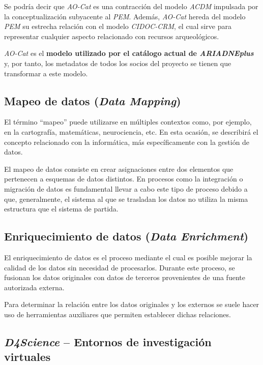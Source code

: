 Se podría decir que \emph{AO-Cat} es una
contracción del modelo \emph{ACDM} impulsada por la conceptualización
subyacente al \emph{PEM}. Además, \emph{AO-Cat} hereda del modelo \emph{PEM} su estrecha
relación con el modelo \emph{CIDOC-CRM}, el cual sirve para representar
cualquier aspecto relacionado con recursos arqueológicos.

\emph{AO-Cat} es el \textbf{modelo utilizado por el catálogo actual de \emph{ARIADNEplus}} y,
por tanto, los metadatos de todos los socios del proyecto se tienen que transformar a este
modelo.

\subsection{Mapeo de datos (\emph{Data Mapping})}

El término ``mapeo'' puede utilizarse en múltiples contextos como, por
ejemplo, en la cartografía, matemáticas, neurociencia, etc. En esta
ocasión, se describirá el concepto relacionado con la informática, más
específicamente con la gestión de datos.

El mapeo de datos consiste en crear asignaciones entre dos elementos que
pertenecen a esquemas de datos distintos. En procesos como la
integración o migración de datos es fundamental llevar a cabo este tipo
de proceso debido a que, generalmente, el sistema al que se trasladan
los datos no utiliza la misma estructura que el sistema de partida.


\subsection{Enriquecimiento de datos (\emph{Data Enrichment})}

El enriquecimiento de datos es el proceso mediante el cual es posible
mejorar la calidad de los datos sin necesidad de procesarlos. Durante
este proceso, se fusionan los datos originales con datos de terceros
provenientes de una fuente autorizada externa. 

Para determinar la relación entre los datos originales y los externos se suele hacer uso de
herramientas auxiliares que permiten establecer dichas relaciones.


\subsection{\emph{D4Science} -- Entornos de investigación virtuales}

